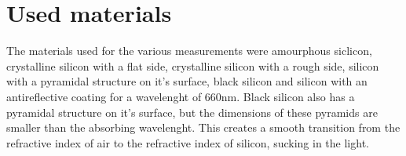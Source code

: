 \section{Used materials}
The materials used for the various measurements were amourphous siclicon, crystalline silicon with a flat side,
crystalline silicon with a rough side, silicon with a pyramidal structure on it's surface,
black silicon and silicon with an antireflective coating for a wavelenght of 660nm.
Black silicon also has a pyramidal structure on it's surface, but the dimensions of
these pyramids are smaller than the absorbing wavelenght. This creates a smooth transition
from the refractive index of air to the refractive index of silicon, sucking in the light.

